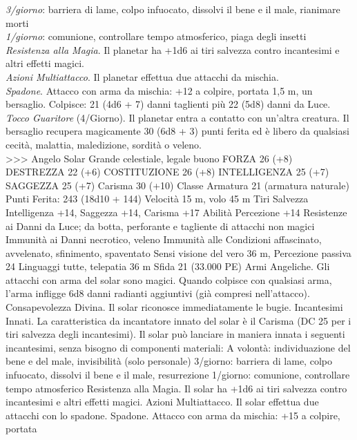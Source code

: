 \begin{multicols}{2}
\textit{3/giorno}: barriera di lame, colpo infuocato, dissolvi il bene e il male, rianimare morti\\
\textit{1/giorno}: comunione, controllare tempo atmosferico, piaga degli insetti\\
\textit{Resistenza alla Magia}. Il planetar ha +1d6 ai tiri salvezza contro incantesimi e altri effetti magici.\\
\textit{Azioni Multiattacco}. Il planetar effettua due attacchi da mischia.\\
\textit{Spadone}. Attacco con arma da mischia: +12 a colpire, portata 1,5 m, un bersaglio.
Colpisce: 21 (4d6 + 7) danni taglienti più 22 (5d8) danni da Luce.\\
\textit{Tocco Guaritore} (4/Giorno). Il planetar entra a contatto con un’altra creatura. Il bersaglio recupera magicamente 30 (6d8 + 3) punti ferita ed è libero da qualsiasi cecità, malattia, maledizione, sordità o veleno.\\
>>>
Angelo Solar
Grande celestiale, legale buono
FORZA 26 (+8)
DESTREZZA 22 (+6)
COSTITUZIONE 26 (+8)
INTELLIGENZA 25 (+7)
SAGGEZZA 25 (+7)
Carisma 30 (+10)
Classe Armatura 21 (armatura naturale)
\hspace*{0pt}\hfill{Punti Ferita}: 243 (18d10 + 144)
Velocità 15 m, volo 45 m
Tiri Salvezza Intelligenza +14, Saggezza +14, Carisma +17
Abilità Percezione +14
Resistenze ai Danni da Luce; da botta, perforante e tagliente
di attacchi non magici
Immunità ai Danni necrotico, veleno
Immunità alle Condizioni affascinato, avvelenato, sfinimento,
spaventato
Sensi visione del vero 36 m, Percezione passiva 24
Linguaggi tutte, telepatia 36 m
Sfida 21 (33.000 PE)
Armi Angeliche. Gli attacchi con arma del solar sono magici.
Quando colpisce con qualsiasi arma, l’arma infligge 6d8 danni
radianti aggiuntivi (già compresi nell’attacco).
Consapevolezza Divina. Il solar riconosce immediatamente le
bugie.
Incantesimi Innati. La caratteristica da incantatore innato del
solar è il Carisma (DC 25 per i tiri salvezza degli incantesimi). Il
solar può lanciare in maniera innata i seguenti incantesimi, senza
bisogno di componenti materiali:
A volontà: individuazione del bene e del male, invisibilità (solo
personale)
3/giorno: barriera di lame, colpo infuocato, dissolvi il bene e il
male, resurrezione
1/giorno: comunione, controllare tempo atmosferico
Resistenza alla Magia. Il solar ha +1d6 ai tiri salvezza
contro incantesimi e altri effetti magici.
Azioni
Multiattacco. Il solar effettua due attacchi con lo spadone.
Spadone. Attacco con arma da mischia: +15 a colpire, portata

\end{multicols}
